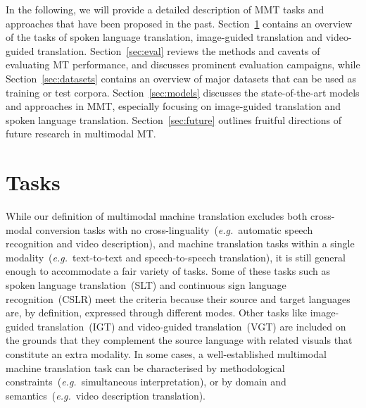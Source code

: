 \documentclass{svjour3}
\newcommand{\eg}[1]{\textit{e.g.}~#1}
\begin{document}
In the following, we will provide a detailed description of MMT tasks and approaches that have been proposed in the past.
    Section~\ref{sec:tasks} contains an overview of the tasks of spoken language translation,
    image-guided translation and video-guided translation. Section~\ref{sec:eval} reviews the methods and caveats of evaluating MT performance, and discusses prominent evaluation campaigns, while Section~\ref{sec:datasets} contains an overview of major datasets that can be used as training or test corpora.
    Section~\ref{sec:models} discusses the state-of-the-art models and approaches in MMT, especially focusing on image-guided translation and spoken language translation.
    Section~\ref{sec:future} outlines fruitful directions of future research in multimodal MT.
    


















    









%
 


\section{Tasks}
\label{sec:tasks}











    While our definition of multimodal machine translation excludes both cross-modal conversion tasks with no cross-linguality~(\eg{automatic speech recognition and video description}), and machine translation tasks within a single modality~(\eg{text-to-text and speech-to-speech translation}), it is still general enough to accommodate a fair variety of tasks. Some of these tasks such as spoken language translation~(SLT) and continuous sign language recognition~(CSLR) meet the criteria because their source and target languages are, by definition, expressed through different modes. Other tasks like image-guided translation~(IGT) and video-guided translation~(VGT) are included on the grounds that they complement the source language with related visuals that constitute an extra modality. In some cases, a well-established multimodal machine translation task can be characterised by methodological constraints~(\eg{simultaneous interpretation}), or by domain and semantics~(\eg{video description translation}).
    
\end{document}
